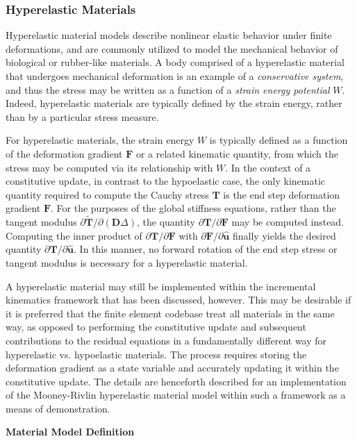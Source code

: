 \subsubsection{Hyperelastic Materials}

Hyperelastic material models describe nonlinear elastic behavior under finite deformations, and are commonly utilized to model the mechanical behavior of biological or rubber-like materials. A body comprised of a hyperelastic material that undergoes mechanical deformation is an example of a  \textit{conservative system}, and thus the stress may be written as a function of a \textit{strain energy potential} $W$. Indeed, hyperelastic materials are typically defined by the strain energy, rather than by a particular stress measure.

For hyperelastic materials, the strain energy $W$ is typically defined as a function of the deformation gradient $\bm{F}$ or a related kinematic quantity, from which the stress may be computed via its relationship with $W$. In the context of a constitutive update, in contrast to the hypoelastic case, the only kinematic quantity required to compute the Cauchy stress $\bm{T}$ is the end step deformation gradient $\bm{F}$. For the purposes of the global stiffness equations, rather than the tangent modulus ${\partial \tilde{\bm{T}}}/{\partial (\bm{D}\Delta)}$, the quantity ${\partial \bm{T}}/{\partial \bm{F}}$ may be computed instead. Computing the inner product of ${\partial \bm{T}}/{\partial \bm{F}}$ with $\partial \bm{F}/\partial \hat{\bm{u}}$ finally yields the desired quantity $\partial \bm{T}/\partial \hat{\bm{u}}$. In this manner, no forward rotation of the end step stress or tangent modulus is necessary for a hyperelastic material.

A hyperelastic material may still be implemented within the incremental kinematics framework that has been discussed, however. This may be desirable if it is preferred that the finite element codebase treat all materials in the same way, as opposed to performing the constitutive update and subsequent contributions to the residual equations in a fundamentally different way for hyperelastic vs. hypoelastic materials. The process requires storing the deformation gradient as a state variable and accurately updating it within the constitutive update. The details are henceforth described for an implementation of the Mooney-Rivlin hyperelastic material model within such a framework as a means of demonstration.

\textbf{Material Model Definition}


